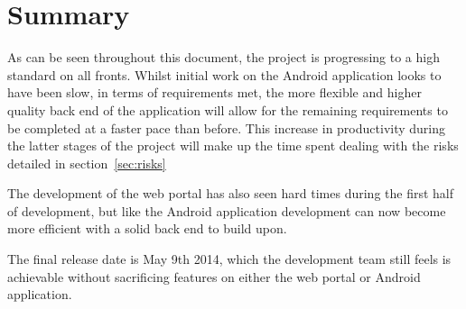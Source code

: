 \documentclass[11pt,a4paper]{article}
\begin{document}
\section{Summary}
\label{sec:summary}
As can be seen throughout this document, the project is progressing to a high standard on all fronts. Whilst initial work on the Android application looks to have been slow, in terms of requirements met, the more flexible and higher quality back end of the application will allow for the remaining requirements to be completed at a faster pace than before. This increase in productivity during the latter stages of the project will make up the time spent dealing with the risks detailed in section~\ref{sec:risks}

The development of the web portal has also seen hard times during the first half of development, but like the Android application development can now become more efficient with a solid back end to build upon.

The final release date is May 9th 2014, which the development team still feels is achievable without sacrificing features on either the web portal or Android application.

\newpage


\end{document}
